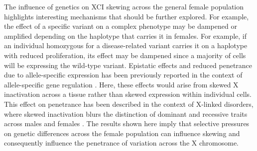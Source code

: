 The influence of genetics on XCI skewing across the general female population highlights interesting mechanisms that should be further explored. For example, the effect of a specific variant on a complex phenotype may be dampened or amplified depending on the haplotype that carries it in females. For example, if an individual homozygous for a disease-related variant carries it on a haplotype with reduced proliferation, its effect may be dampened since a majority of cells will be expressing the wild-type variant. Epistatic effects and reduced penetrance due to allele-specific expression has been previously reported in the context of allele-specific gene regulation \cite{Castel2018-wo,Lappalainen2011-mu}. Here, these effects would arise from skewed X inactivation across a tissue rather than skewed expression within individual cells. This effect on penetrance has been described in the context of X-linked disorders, where skewed inactivation blurs the distinction of dominant and recessive traits across males and females \cite{Dobyns2004-ac}. The results shown here imply that selective pressures on genetic differences across the female population can influence skewing and consequently influence the penetrance of variation across the X chromosome.